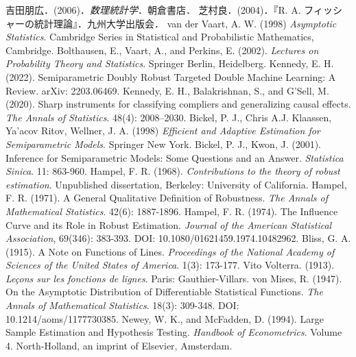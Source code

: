 \documentclass[uplatex, dvipdfmx]{jsarticle}
\begin{document}
\begin{thebibliography}{99}
    吉田朋広．(2006)．\textit{数理統計学}．朝倉書店．
    芝村良．(2004)．『R. A. フィッシャーの統計理論』．九州大学出版会．
    van der Vaart, A. W. (1998) \textit{Asymptotic Statistics}. Cambridge Series in Statistical and Probabilistic Mathematics, Cambridge.
    Bolthausen, E., Vaart, A., and Perkins, E. (2002). \textit{Lectures on Probability Theory and Statistics}. Springer Berlin, Heidelberg.
    Kennedy, E. H. (2022). Semiparametric Doubly Robust Targeted Double Machine Learning: A Review. arXiv: 2203.06469.
    Kennedy, E. H., Balakrishnan, S., and G’Sell, M. (2020). Sharp instruments for classifying compliers and generalizing causal effects. \textit{The Annals of Statistics}. 48(4): 2008–2030.
    Bickel, P. J., Chris A.J. Klaassen, Ya'acov Ritov, Wellner, J. A. (1998) \textit{Efficient and Adaptive Estimation for Semiparametric Models}. Springer New York.
    Bickel, P. J., Kwon, J. (2001). Inference for Semiparametric Models: Some Questions and an Answer. \textit{Statistica Sinica}. 11: 863-960.
    Hampel, F. R. (1968). \textit{Contributions to the theory of robust estimation}. Unpublished dissertation, Berkeley: University of California.
    Hampel, F. R. (1971). A General Qualitative Definition of Robustness. \textit{The Annals of Mathematical Statistics}. 42(6): 1887-1896.
    Hampel, F. R. (1974). The Influence Curve and its Role in Robust Estimation. \textit{Journal of the American Statistical Association}, 69(346): 383-393. DOI: 10.1080/01621459.1974.10482962.
    Bliss, G. A. (1915). A Note on Functions of Lines. \textit{Proceedings of the National Academy of Sciences of the United States of America}. 1(3): 173-177.
    Vito Volterra. (1913). \textit{Le\c{c}ons sur les fonctions de lignes}. Paris: Gauthier-Villars.
    von Mises, R. (1947). On the Asymptotic Distribution of Differentiable Statistical Functions. \textit{The Annals of Mathematical Statistics}. 18(3): 309-348. DOI: 10.1214/aoms/1177730385.
    Newey, W. K., and McFadden, D. (1994). Large Sample Estimation and Hypothesis Testing. \textit{Handbook of Econometrics}. Volume 4. North-Holland, an imprint of Elsevier, Amsterdam.

\end{thebibliography}
\end{document}
